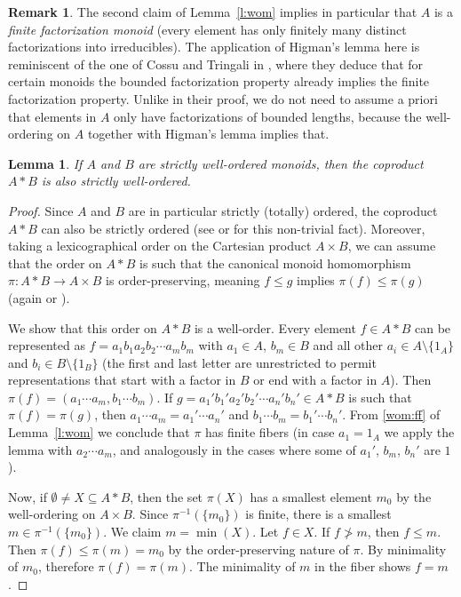 \documentclass{amsart}
\theoremstyle{plain}
\newtheorem{lemma}[thm]{Lemma}
\theoremstyle{definition}
\newtheorem{remark}[thm]{Remark}
\begin{document}
\begin{remark}
  The second claim of Lemma~\ref{l:wom} implies in particular that $A$ is a \emph{finite factorization monoid} (every element has only finitely many distinct factorizations into irreducibles).
  The application of Higman's lemma here is reminiscent of the one of Cossu and Tringali in \cite[Theorem 4.11]{cossu-tringali23}, where they deduce that for certain monoids the bounded factorization property already implies the finite factorization property.
  Unlike in their proof, we do not need to assume a priori that elements in $A$ only have factorizations of bounded lengths, because the well-ordering on $A$ together with Higman's lemma implies that.
\end{remark}

\begin{lemma} \label{l:order-coproduct}
  If $A$ and $B$ are strictly well-ordered monoids, then the coproduct $A * B$ is also strictly well-ordered.
\end{lemma}

\begin{proof}
  Since $A$ and $B$ are in particular strictly (totally) ordered, the coproduct $A * B$ can also be strictly ordered (see \cite{johnson68} or \cite[Theorem 16]{bergman90} for this non-trivial fact).
  Moreover, taking a lexicographical order on the Cartesian product $A \times B$, we can assume that the order on $A*B$ is such that the canonical monoid homomorphism $\pi \colon A * B \to A \times B$ is order-preserving, meaning $f \le g$ implies $\pi(f) \le \pi(g)$ (again \cite{johnson68} or \cite[p.322, \S5, paragraph after (20)]{bergman90}).

  We show that this order on $A*B$ is a well-order.
  Every element $f \in A*B$ can be represented as $f=a_1b_1 a_2b_2 \cdots a_m b_m$ with $a_1 \in A$, $b_m \in B$ and all other $a_i \in A \setminus \{1_A\}$ and $b_i \in B \setminus \{1_B\}$ (the first and last letter are unrestricted to permit representations that start with a factor in $B$ or end with a factor in $A$).
  Then $\pi(f) = (a_1\cdots a_m, b_1\cdots b_m)$.
  If $g=a_1'b_1' a_2'b_2' \cdots a_n' b_n'\in A * B$ is such that $\pi(f)=\pi(g)$, then $a_1 \cdots a_m = a_1'\cdots a_n'$ and $b_1\cdots b_m=b_1'\cdots b_n'$.
  From \ref{wom:ff} of Lemma~\ref{l:wom} we conclude that $\pi$ has finite fibers (in case $a_1=1_A$ we apply the lemma with $a_2\cdots a_m$, and analogously in the cases where some of $a_1'$, $b_m$, $b_n'$ are $1$).

  Now, if $\emptyset \ne  X \subseteq A*B$, then the set $\pi(X)$ has a smallest element $m_0$ by the well-ordering on $A\times B$.
  Since $\pi^{-1}(\{m_0\})$ is finite, there is a smallest $m \in \pi^{-1}(\{m_0\})$.
  We claim $m = \min(X)$.
  Let $f \in X$.
  If $f \not > m$, then $f \le m$.
  Then $\pi(f) \le \pi(m)=m_0$ by the order-preserving nature of $\pi$.
  By minimality of $m_0$, therefore $\pi(f)=\pi(m)$.
  The minimality of $m$ in the fiber shows $f=m$.
\end{proof}
\end{document}
